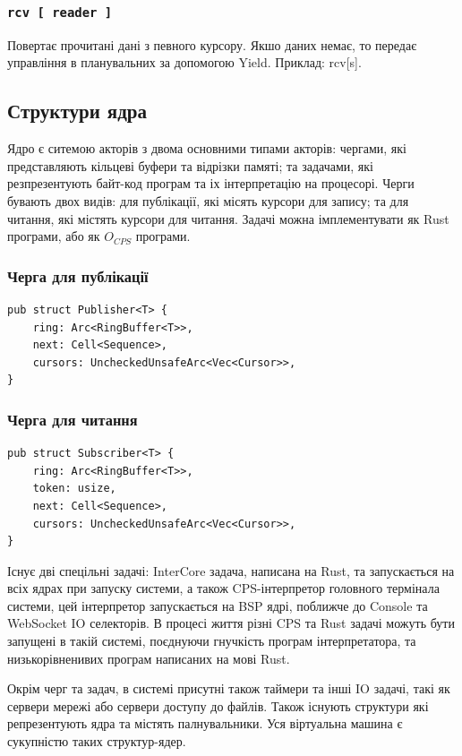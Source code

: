 \subsubsection*{\lstinline{rcv [ reader ]}}
Повертає прочитані дані з певного курсору.
Якшо даних немає, то передає управління в планувальних за допомогою Yield.
Приклад: rcv[s].

\newpage
\subsection{Структури ядра}
Ядро є ситемою акторів з двома основними типами акторів:
чергами, які представляють кільцеві буфери та відрізки памяті;
та задачами, які резпрезентують байт-код програм та іх інтерпретацію на процесорі.
Черги бувають двох видів: для публікації, які місять курсори для запису;
та для читання, які містять курсори для читання. Задачі можна імплементувати
як Rust програми, або як $O_{CPS}$ програми.

\subsubsection{Черга для публікації}
\begin{lstlisting}
pub struct Publisher<T> {
    ring: Arc<RingBuffer<T>>,
    next: Cell<Sequence>,
    cursors: UncheckedUnsafeArc<Vec<Cursor>>,
}
\end{lstlisting}

\subsubsection{Черга для читання}
\begin{lstlisting}
pub struct Subscriber<T> {
    ring: Arc<RingBuffer<T>>,
    token: usize,
    next: Cell<Sequence>,
    cursors: UncheckedUnsafeArc<Vec<Cursor>>,
}
\end{lstlisting}

Існує дві спецільні задачі: InterCore задача, написана на Rust,
та запускається на всіх ядрах при запуску системи, а також CPS-інтерпретор
головного термінала системи, цей інтерпретор запускається на BSP ядрі,
поближче до Console та WebSocket IO селекторів.
В процесі життя різні CPS та Rust задачі можуть бути запущені в такій системі,
поєднуючи гнучкість програм інтерпретатора, та низькорівненивих програм написаних на мові Rust.

Окрім черг та задач, в системі присутні також таймери та інші IO задачі,
такі як сервери мережі або сервери доступу до файлів. Також існують
структури які репрезентують ядра та містять палнувальники.
Уся віртуальна машина є сукупністю таких структур-ядер.

